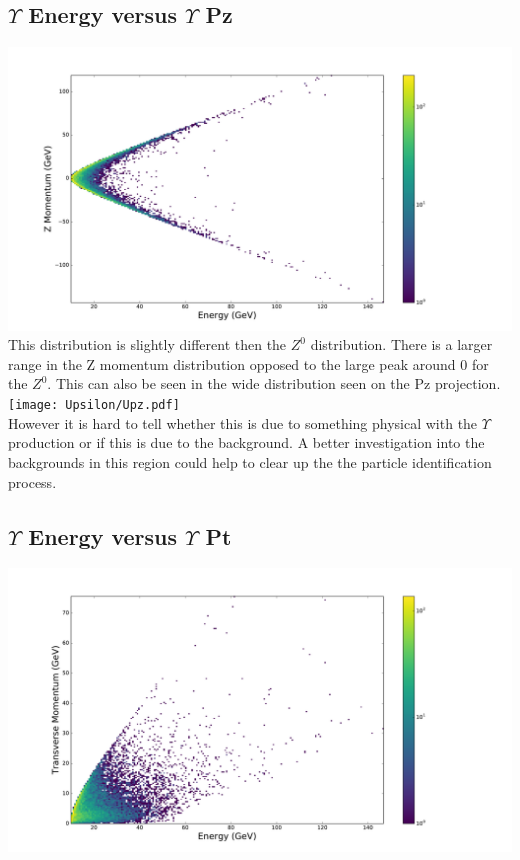\documentclass[a4paper, 11pt]{article}
\begin{document}
\subsection*{$\Upsilon$ Energy versus $\Upsilon$ Pz}
\includegraphics[width=\textwidth]{Upsilon/UE_Upz.pdf} \\

This distribution is slightly different then the $Z^0$ distribution. There is a larger range in the Z momentum distribution opposed to the large peak around 0 for the $Z^0$.  This can also be seen in the wide distribution seen on the Pz projection. \\

\texttt{[image: Upsilon/Upz.pdf]} \\

However it is hard to tell whether this is due to something physical with the $\Upsilon$ production or if this is due to the background.  A better investigation into the backgrounds in this region could help to clear up the the particle identification process. \\ 

\subsection*{$\Upsilon$ Energy versus $\Upsilon$ Pt}
\includegraphics[width=\textwidth]{Upsilon/UE_Upt_log.pdf} \\
\end{document}
